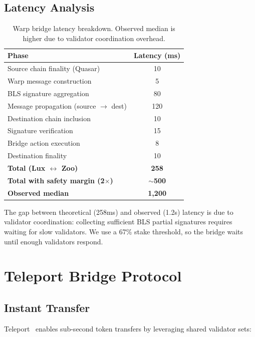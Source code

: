 \documentclass[11pt,letterpaper]{article}
\begin{document}
\subsection{Latency Analysis}

\begin{table}[t]
\centering
\begin{tabular}{lc}
\toprule
\textbf{Phase} & \textbf{Latency (ms)} \\
\midrule
Source chain finality (Quasar) & 10 \\
Warp message construction & 5 \\
BLS signature aggregation & 80 \\
Message propagation (source $\to$ dest) & 120 \\
Destination chain inclusion & 10 \\
Signature verification & 15 \\
Bridge action execution & 8 \\
Destination finality & 10 \\
\midrule
\textbf{Total (Lux $\leftrightarrow$ Zoo)} & \textbf{258} \\
\textbf{Total with safety margin (2$\times$)} & \textbf{$\sim$500} \\
\textbf{Observed median} & \textbf{1,200} \\
\bottomrule
\end{tabular}
\caption{Warp bridge latency breakdown. Observed median is higher due to validator coordination overhead.}
\label{tab:warp-latency}
\end{table}

The gap between theoretical (258ms) and observed (1.2s) latency is due to validator coordination: collecting sufficient BLS partial signatures requires waiting for slow validators. We use a 67\% stake threshold, so the bridge waits until enough validators respond.

\section{Teleport Bridge Protocol}
\label{sec:teleport}

\subsection{Instant Transfer}

Teleport~\cite{lux-teleport-protocol} enables sub-second token transfers by leveraging shared validator sets:
\end{document}
